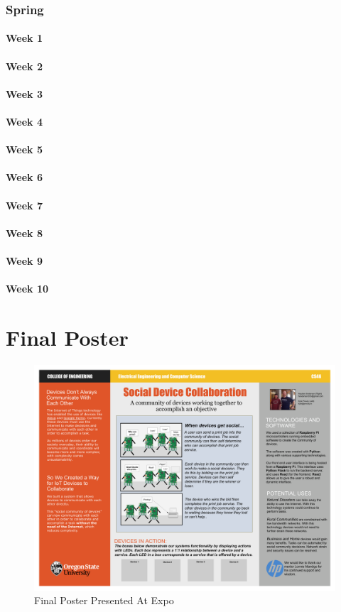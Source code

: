 \documentclass[draftclsnofoot, onecolumn, compsoc, 10pt]{IEEEtran}
\begin{document}
\subsubsection{Spring}
\paragraph{Week 1}
\paragraph{Week 2}
\paragraph{Week 3}
\paragraph{Week 4}
\paragraph{Week 5}
\paragraph{Week 6}
\paragraph{Week 7}
\paragraph{Week 8}
\paragraph{Week 9}
\paragraph{Week 10}

\section{Final Poster}
\begin{figure}
    \centering
    \includegraphics[scale=0.25]{team46_final_poster.png}
    \caption{Final Poster Presented At Expo}
    \label{fig:my_label}
\end{figure}
\end{document}
